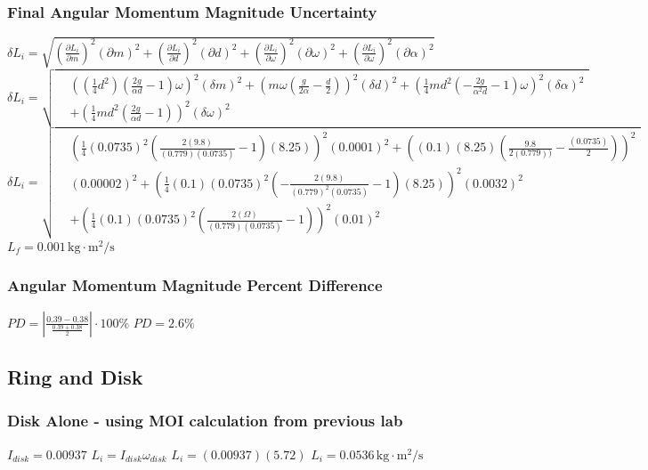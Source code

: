 \documentclass[12pt]{article}
\begin{document}
\subsubsection{Final Angular Momentum Magnitude Uncertainty}
$\delta L_i = \sqrt
{
\left(\frac
{\partial L_i}{\partial m}\right)^2(\partial m)^2+ 
\left(\frac
{\partial L_i}{\partial d}\right)^2(\partial d)^2+
\left(\frac
{\partial L_i}{\partial \omega}\right)^2(\partial \omega)^2+ \left(\frac
{\partial L_i}{\partial \omega}\right)^2(\partial \alpha)^2}$ 
\newline
\begin{equation}
\delta L_i = \sqrt{
    \begin{aligned}
        &\left( (\frac{1}{4}d^2)(\frac{2g}{\alpha d} - 1)\omega\right)^2(\delta m)^2 + \left( m\omega (\frac{g}{2\alpha}-\frac{d}{2})\right)^2(\delta d)^2 + \left( \frac{1}{4}md^2 (-\frac {2g}{\alpha ^2 d}-1)\omega\right)^2(\delta \alpha)^2 \\ &+ \left( \frac{1}{4}md^2(\frac{2g}{\alpha d}-1)\right)^2(\delta \omega)^2
    \end{aligned}
}
\end{equation}
\newline
\begin{equation}
\delta L_i = \sqrt{
    \begin{aligned}
        &\left( \frac{1}{4}(0.0735)^2(\frac{2(9.8)}{(0.779)(0.0735)} - 1)(8.25)\right)^2(0.0001)^2 + \left( (0.1)(8.25)(\frac{9.8}{2(0.779))}-\frac{(0.0735)}{2})\right)^2 \\ &(0.00002)^2 + \left( \frac{1}{4}(0.1)(0.0735)^2 (-\frac {2(9.8)}{(0.779) ^2 (0.0735)}-1)(8.25)\right)^2(0.0032)^2 \\ &+ \left( \frac{1}{4}(0.1)(0.0735)^2(\frac{2(Ω)}{(0.779)(0.0735)}-1)\right)^2(0.01)^2
    \end{aligned}
}
\end{equation}
$L_f = 0.001 \, \text{kg} \cdot \text{m}^2 / \text{s}$
\subsubsection{Angular Momentum Magnitude Percent Difference}
$PD = \left| \frac{0.39 - 0.38}{\frac{0.39+0.38}{2}}\right| \cdot 100\%$
\newline
$PD = 2.6\%$
\subsection{Ring and Disk}
\subsubsection{Disk Alone - using MOI calculation from previous lab}
$I_{disk} = 0.00937$
\newline
$L_i = I_{disk} \omega_{disk}$
\newline
$L_i = (0.00937)(5.72)$
\newline
$L_i = 0.0536 \, \text{kg} \cdot \text{m}^2 / \text{s}$
\end{document}
